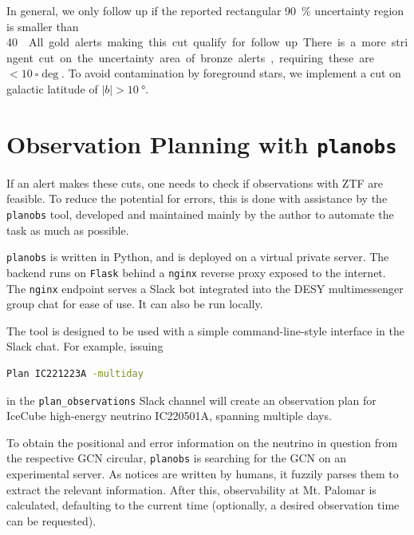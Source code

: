 \documentclass[
    a4paper, %
    fontsize=10pt, %
    twoside=true, %
    numbers=noenddot, %
    fontmethod=tex,
]{kaobook}
\begin{document}
In general, we only follow up if the reported rectangular \SI{90}{\percent} uncertainty region is smaller than \SI{40}{\square\deg}. All gold alerts making this cut qualify for follow up. There is a more stringent cut on the uncertainty area of bronze alerts, requiring these are $<\SI{10}{\square\deg}$. To avoid contamination by foreground stars, we implement a cut on galactic latitude of $|b|>\SI{10}{\degree}$.

\section{Observation Planning with \texttt{planobs}}\label{planobs}
If an alert makes these cuts, one needs to check if observations with ZTF are feasible. To reduce the potential for errors, this is done with assistance by the \texttt{planobs}  tool, developed and maintained mainly by the author to automate the task as much as possible.

\texttt{planobs} is written in Python, and is deployed on a virtual private server. The backend runs on \texttt{Flask} behind a \texttt{nginx} reverse proxy exposed to the internet. The \texttt{nginx} endpoint serves a Slack bot integrated into the DESY multimessenger group chat for ease of use. It can also be run locally.

The tool is designed to be used with a simple command-line-style interface in the Slack chat. For example, issuing
\begin{lstlisting}[language=bash,style=kaolstplain]
Plan IC221223A -multiday
\end{lstlisting}
in the \texttt{plan\_observations} Slack channel will create an observation plan for IceCube high-energy neutrino IC220501A, spanning multiple days.

To obtain the positional and error information on the neutrino in question from the respective GCN circular, \texttt{planobs} is searching for the GCN on an experimental server. As notices are written by humans, it fuzzily parses them to extract the relevant information. After this, observability at Mt. Palomar is calculated, defaulting to the current time (optionally, a desired observation time can be requested). 
\end{document}
